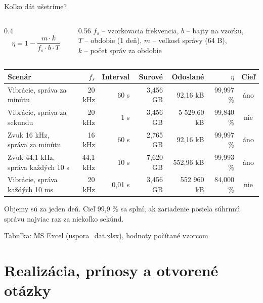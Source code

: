 \documentclass[aspectratio=169,11pt]{beamer}
\newcommand{\presenter}{}
\newcommand{\setpresenter}[1]{\renewcommand{\presenter}{#1}}
\newcommand{\zdroj}[1]{\par\vfill\hfill{\scriptsize\color{seText!65}#1}}
\begin{document}
\begin{frame}{Koľko dát ušetríme?}
  \begin{columns}[c]
    \begin{column}{0.4\textwidth}
      \[ \eta = 1 - \frac{m \cdot k}{f_s \cdot b \cdot T} \]
    \end{column}
    \begin{column}{0.56\textwidth}
      \scriptsize
      $f_s$ -- vzorkovacia frekvencia, $b$ -- bajty na vzorku,\\
      $T$ -- obdobie (1 deň), $m$ -- veľkosť správy (64 B),\\
      $k$ -- počet správ za obdobie
    \end{column}
  \end{columns}
  \medskip
  \footnotesize
  \setlength{\tabcolsep}{3.5pt}
  \begin{tabularx}{\textwidth}{@{}>{\raggedright\arraybackslash}X r r r r r c@{}}
    \toprule
    \textbf{Scenár} & $f_s$ & \textbf{Interval} & \textbf{Surové} & \textbf{Odoslané} & $\eta$ & \textbf{Cieľ} \\
    \midrule
    Vibrácie, správa za minútu        & 20 kHz   & 60 s    & 3,456 GB & 92,16 kB     & 99,997 \% & \textcolor{seGreen}{áno} \\
    Vibrácie, správa za sekundu       & 20 kHz   & 1 s     & 3,456 GB & 5 529,60 kB  & 99,840 \% & \textcolor{seOrange}{nie} \\
    Zvuk 16 kHz, správa za minútu     & 16 kHz   & 60 s    & 2,765 GB & 92,16 kB     & 99,997 \% & \textcolor{seGreen}{áno} \\
    Zvuk 44,1 kHz, správa každých 10 s & 44,1 kHz & 10 s    & 7,620 GB & 552,96 kB    & 99,993 \% & \textcolor{seGreen}{áno} \\
    Vibrácie, správa každých 10 ms    & 20 kHz   & 0,01 s  & 3,456 GB & 552 960 kB   & 84,000 \% & \textcolor{seOrange}{nie} \\
    \bottomrule
  \end{tabularx}
  \normalsize
  \medskip

  Objemy sú za jeden deň. Cieľ 99,9 \% sa splní, ak zariadenie posiela súhrnnú správu najviac raz za niekoľko sekúnd.
  \zdroj{Tabuľka: MS Excel (uspora\_dat.xlsx), hodnoty počítané vzorcom}
\end{frame}

\setpresenter{Ján Vargovčík}
\section{Realizácia, prínosy a otvorené otázky}
\end{document}

